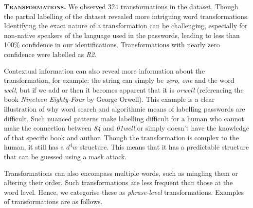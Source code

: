 
\textbf{\textsc{Transformations.}}\: We observed 324 transformations in the \hmail dataset. Though the partial labelling of the \phpbb dataset revealed more intriguing word transformations. Identifying the exact nature of a transformation can be challenging, especially for non-native speakers of the language used in the passwords, leading to less than 100\% confidence in our identifications. Transformations with nearly zero confidence were labelled as \textit{R2}.

Contextual information can also reveal more information about the transformation, for example: the string  can simply be \textit{zero}, \textit{one} and the word \textit{well}, but if we add  or  then it becomes apparent that it is \textit{orwell} (referencing the book \textit{Nineteen Eighty-Four} \cite{Orwell_Fromm_2000} by George Orwell). This example is a clear illustration of why word search and algorithmic means of labelling passwords are difficult. Such nuanced patterns make labelling difficult for a human who cannot make the connection between \textit{84} and \textit{01well} or simply doesn't have the knowledge of that specific book and author. Though the transformation is complex to the human, it still has a $d^4w$ structure. This means that it has a predictable structure that can be guessed using a mask attack.

\newpage
Transformations can also encompass multiple words, such as mingling them or altering their order. Such transformations are less frequent than those at the word level. Hence, we categorise these as \textit{phrase-level} transformations. Examples of transformations are as follows.

